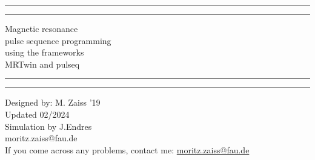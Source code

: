 \documentclass[a4paper,12pt]{extarticle}
\begin{document}

\graphicspath{ {./img/} }
\begin{titlepage}
	\centering %
	\scshape %
	\vspace*{1.5\baselineskip} %

	\rule{13cm}{1.6pt}\vspace*{-\baselineskip}\vspace*{2pt} %
	\rule{13cm}{0.4pt} %
	
		\vspace{0.75\baselineskip} %
		{\Huge Magnetic resonance  \\ 
			\vspace{4mm}
            pulse sequence programming \\
            \vspace{4mm}
	         using the frameworks \\ MRTwin and pulseq \\	
        }
		\vspace{0.75\baselineskip} %
	\rule{13cm}{0.4pt}\vspace*{-\baselineskip}\vspace{3.2pt} %
	\rule{13cm}{1.6pt} %
	
		\vspace{1.75\baselineskip} %
	{\large Designed by: M. Zaiss '19 \\
	Updated 02/2024 \\
 \vspace*{1.2\baselineskip}
 Simulation by J.Endres\\
		\vspace*{1.2\baselineskip}
	moritz.zaiss@fau.de} \\
	\vfill
If you come across any problems, contact me: \url{moritz.zaiss@fau.de}\\ \vspace{1mm}
\end{titlepage}
\tableofcontents
\vfill
\end{document}
